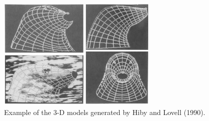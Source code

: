 \documentclass[11pt]{article}
\begin{document}
\begin{figure}
  \begin{flushright}
    \includegraphics[width=3in]{SealWireFrame.png}
  \end{flushright}
  \caption{Example of the 3-D models generated by Hiby and Lovell (1990).}
\end{figure}
\end{document}
